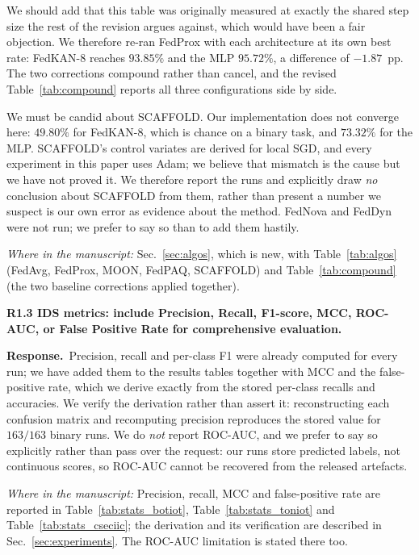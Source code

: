 \documentclass[11pt]{article}
\newcommand{\rc}[1]{\medskip\noindent\textbf{\textcolor[rgb]{0.35,0.35,0.35}{#1}}\par\nopagebreak}
\newcommand{\reply}{\medskip\noindent\textbf{Response.}\ }
\newcommand{\where}[1]{\par\smallskip\noindent\emph{Where in the manuscript:} #1\par}
\begin{document}
We should add that this table was originally measured at exactly the shared step size the rest of
the revision argues against, which would have been a fair objection. We therefore re-ran FedProx
with each architecture at its own best rate: FedKAN-8 reaches $93.85\%$ and the MLP $95.72\%$, a
difference of $-1.87$~pp. The two corrections compound rather than cancel, and the revised
Table~\ref{tab:compound} reports all three configurations side by side.

We must be candid about SCAFFOLD. Our implementation does not converge here: $49.80\%$ for
FedKAN-8, which is chance on a binary task, and $73.32\%$ for the MLP. SCAFFOLD's control
variates are derived for local SGD, and every experiment in this paper uses Adam; we believe
that mismatch is the cause but we have not proved it. We therefore report the runs and
explicitly draw \emph{no} conclusion about SCAFFOLD from them, rather than present a number we
suspect is our own error as evidence about the method. FedNova and FedDyn were not run; we
prefer to say so than to add them hastily.
\where{Sec.~\ref{sec:algos}, which is new, with Table~\ref{tab:algos} (FedAvg, FedProx, MOON, FedPAQ, SCAFFOLD) and Table~\ref{tab:compound} (the two baseline corrections applied together).}

\rc{R1.3 IDS metrics: include Precision, Recall, F1-score, MCC, ROC-AUC, or False
Positive Rate for comprehensive evaluation.}
\reply Precision, recall and per-class F1 were already computed for every run; we
have added them to the results tables together with MCC and the false-positive rate,
which we derive exactly from the stored per-class recalls and accuracies. We verify
the derivation rather than assert it: reconstructing each confusion matrix and
recomputing precision reproduces the stored value for $163/163$ binary runs.
We do \emph{not} report ROC-AUC, and we prefer to say so explicitly rather than pass
over the request: our runs store predicted labels, not continuous scores, so ROC-AUC
cannot be recovered from the released artefacts.

\where{Precision, recall, MCC and false-positive rate are reported in Table~\ref{tab:stats_botiot}, Table~\ref{tab:stats_toniot} and Table~\ref{tab:stats_cseciic}; the derivation and its verification are described in Sec.~\ref{sec:experiments}. The ROC-AUC limitation is stated there too.}
\end{document}
